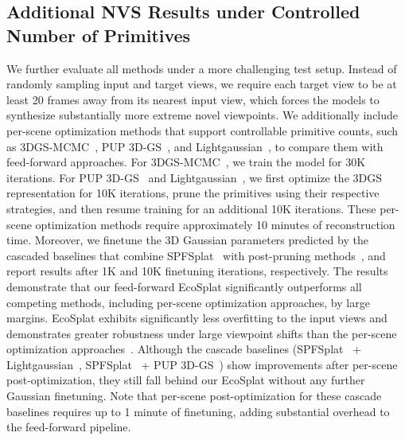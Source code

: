 \subsection{Additional NVS Results under Controlled Number of Primitives} 
We further evaluate all methods under a more challenging test setup. Instead of randomly sampling input and target views, we require each target view to be at least 20 frames away from its nearest input view, which forces the models to synthesize substantially more extreme novel viewpoints.
We additionally include per-scene optimization methods that support controllable primitive counts, such as 3DGS-MCMC~\cite{kheradmand20243d}, PUP 3D-GS~\cite{HansonTuPUP3DGS}, and Lightgaussian~\cite{fan2023lightgaussian}, to compare them with feed-forward approaches.
For 3DGS-MCMC~\cite{kheradmand20243d}, we train the model for 30K iterations.
For PUP 3D-GS~\cite{HansonTuPUP3DGS} and Lightgaussian~\cite{fan2023lightgaussian}, we first optimize the 3DGS representation for 10K iterations, prune the primitives using their respective strategies, and then resume training for an additional 10K iterations.
These per-scene optimization methods require approximately 10 minutes of reconstruction time.
Moreover, we finetune the 3D Gaussian parameters predicted by the cascaded baselines that combine SPFSplat~\cite{huang2025no} with post-pruning methods~\cite{fan2023lightgaussian, HansonTuPUP3DGS}, and report results after 1K and 10K finetuning iterations, respectively.
The results demonstrate that our feed-forward EcoSplat significantly outperforms all competing methods, including per-scene optimization approaches, by large margins. EcoSplat exhibits significantly less overfitting to the input views and demonstrates greater robustness under large viewpoint shifts than the per-scene optimization approaches~\cite{kheradmand20243d, HansonTuPUP3DGS, fan2023lightgaussian}. Although the cascade baselines (SPFSplat~\cite{huang2025no} + Lightgaussian~\cite{fan2023lightgaussian}, SPFSplat~\cite{huang2025no} + PUP 3D-GS~\cite{HansonTuPUP3DGS}) show improvements after per-scene post-optimization, they still fall behind our EcoSplat without any further Gaussian finetuning. Note that per-scene post-optimization for these cascade baselines requires up to 1 minute of finetuning, adding substantial overhead to the feed-forward pipeline.





